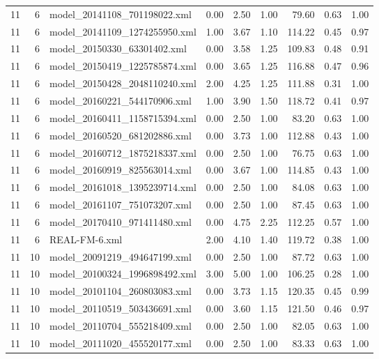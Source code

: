 \begin{table}[ht]
\begin{tabular}{rrlrrrrrr}
   11 &   6 & model\_20141108\_701198022.xml & 0.00 & 2.50 & 1.00 & 79.60 & 0.63 & 1.00 \\ 
   11 &   6 & model\_20141109\_1274255950.xml & 1.00 & 3.67 & 1.10 & 114.22 & 0.45 & 0.97 \\ 
   11 &   6 & model\_20150330\_63301402.xml & 0.00 & 3.58 & 1.25 & 109.83 & 0.48 & 0.91 \\ 
   11 &   6 & model\_20150419\_1225785874.xml & 0.00 & 3.65 & 1.25 & 116.88 & 0.47 & 0.96 \\ 
   11 &   6 & model\_20150428\_2048110240.xml & 2.00 & 4.25 & 1.25 & 111.88 & 0.31 & 1.00 \\ 
   11 &   6 & model\_20160221\_544170906.xml & 1.00 & 3.90 & 1.50 & 118.72 & 0.41 & 0.97 \\ 
   11 &   6 & model\_20160411\_1158715394.xml & 0.00 & 2.50 & 1.00 & 83.20 & 0.63 & 1.00 \\ 
   11 &   6 & model\_20160520\_681202886.xml & 0.00 & 3.73 & 1.00 & 112.88 & 0.43 & 1.00 \\ 
   11 &   6 & model\_20160712\_1875218337.xml & 0.00 & 2.50 & 1.00 & 76.75 & 0.63 & 1.00 \\ 
   11 &   6 & model\_20160919\_825563014.xml & 0.00 & 3.67 & 1.00 & 114.85 & 0.43 & 1.00 \\ 
   11 &   6 & model\_20161018\_1395239714.xml & 0.00 & 2.50 & 1.00 & 84.08 & 0.63 & 1.00 \\ 
   11 &   6 & model\_20161107\_751073207.xml & 0.00 & 2.50 & 1.00 & 87.45 & 0.63 & 1.00 \\ 
   11 &   6 & model\_20170410\_971411480.xml & 0.00 & 4.75 & 2.25 & 112.25 & 0.57 & 1.00 \\ 
   11 &   6 & REAL-FM-6.xml & 2.00 & 4.10 & 1.40 & 119.72 & 0.38 & 1.00 \\ 
   11 &  10 & model\_20091219\_494647199.xml & 0.00 & 2.50 & 1.00 & 87.72 & 0.63 & 1.00 \\ 
   11 &  10 & model\_20100324\_1996898492.xml & 3.00 & 5.00 & 1.00 & 106.25 & 0.28 & 1.00 \\ 
   11 &  10 & model\_20101104\_260803083.xml & 0.00 & 3.73 & 1.15 & 120.35 & 0.45 & 0.99 \\ 
   11 &  10 & model\_20110519\_503436691.xml & 0.00 & 3.60 & 1.15 & 121.50 & 0.46 & 0.97 \\ 
   11 &  10 & model\_20110704\_555218409.xml & 0.00 & 2.50 & 1.00 & 82.05 & 0.63 & 1.00 \\ 
   11 &  10 & model\_20111020\_455520177.xml & 0.00 & 2.50 & 1.00 & 83.33 & 0.63 & 1.00 \\ 

\end{tabular}
\end{table}
